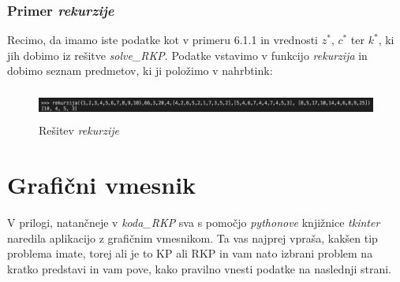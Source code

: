 \documentclass[a4paper,12pt]{article}
\theoremstyle{definition}
\begin{document}
\subsubsection{Primer \textit{rekurzije}}

Recimo, da imamo iste podatke kot v primeru 6.1.1 in vrednosti $z^{*}$, $c^{*}$ ter $k^{*}$, ki jih dobimo 
iz rešitve \textit{solve\_RKP}. Podatke vstavimo v funkcijo \textit{rekurzija} in dobimo seznam predmetov, 
ki ji položimo v nahrbtink: 

\begin{figure}[h]
    \includegraphics[width=14cm, height = 1cm]{primer_rekurzija.png}
    \caption{Rešitev \textit{rekurzije}}
    \label{fig:koda6}    
\end{figure}

\section{Grafični vmesnik}

V prilogi, natančneje v \textit{koda\_RKP} sva s pomočjo \textit{pythonove} knjižnice \textit{tkinter}
naredila aplikacijo z grafičnim vmesnikom. Ta vas najprej vpraša, kakšen tip problema imate, torej ali 
je to KP ali RKP in vam nato izbrani problem na kratko predstavi in vam pove, kako pravilno vnesti podatke 
na naslednji strani.
\end{document}
